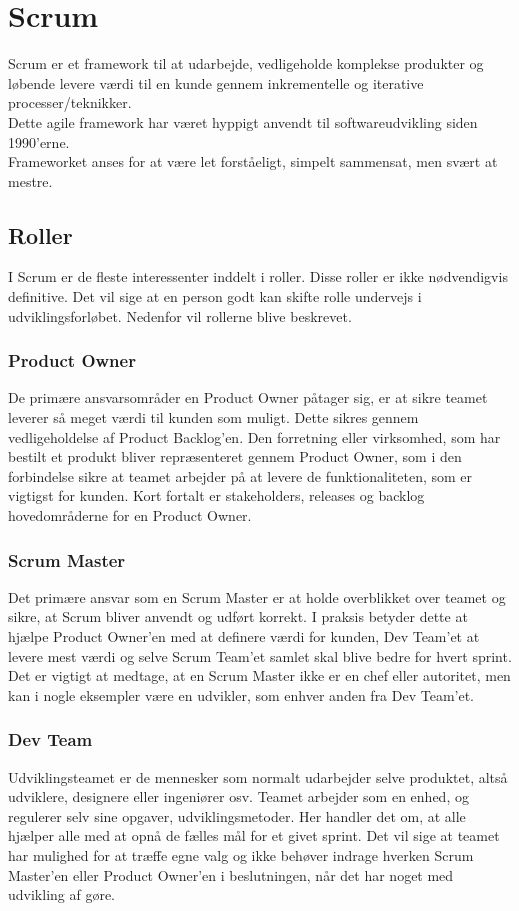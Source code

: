 \section{Scrum}\label{sec:scrum}
Scrum er et framework til at udarbejde, vedligeholde komplekse produkter og løbende levere 
værdi til en kunde gennem inkrementelle og iterative processer/teknikker. \\

Dette agile framework har været hyppigt anvendt til softwareudvikling siden 1990’erne. \\

Frameworket anses for at være let forståeligt, simpelt sammensat, men svært at mestre.

\subsection{Roller}
I Scrum er de fleste interessenter inddelt i roller. Disse roller er ikke nødvendigvis definitive. Det vil sige at
en person godt kan skifte rolle undervejs i udviklingsforløbet. Nedenfor vil rollerne blive beskrevet.

\subsubsection{Product Owner}
De primære ansvarsområder en Product Owner påtager sig, er at sikre teamet leverer så 
meget værdi til kunden som muligt. Dette sikres gennem vedligeholdelse af Product Backlog’en. 
Den forretning eller virksomhed, som har bestilt et produkt bliver repræsenteret gennem 
Product Owner, som i den forbindelse sikre at teamet arbejder på at levere de funktionaliteten, 
som er vigtigst for kunden. Kort fortalt er stakeholders, releases og backlog hovedområderne for en Product Owner.

\subsubsection{Scrum Master}
Det primære ansvar som en Scrum Master er at holde overblikket over teamet og sikre, at Scrum bliver anvendt 
og udført korrekt. I praksis betyder dette at hjælpe Product Owner’en med at definere værdi for kunden, 
Dev Team’et at levere mest værdi og selve Scrum Team’et samlet skal blive bedre for hvert sprint. 
Det er vigtigt at medtage, at en Scrum Master ikke er en chef eller autoritet, men kan i nogle eksempler 
være en udvikler, som enhver anden fra Dev Team’et.

\subsubsection{Dev Team}
Udviklingsteamet er de mennesker som normalt udarbejder selve produktet, altså udviklere, designere 
eller ingeniører osv. Teamet arbejder som en enhed, og regulerer selv sine opgaver, udviklingsmetoder. 
Her handler det om, at alle hjælper alle med at opnå de fælles mål for et givet sprint. Det vil sige 
at teamet har mulighed for at træffe egne valg og ikke behøver indrage hverken Scrum Master’en eller 
Product Owner’en i beslutningen, når det har noget med udvikling af gøre.

